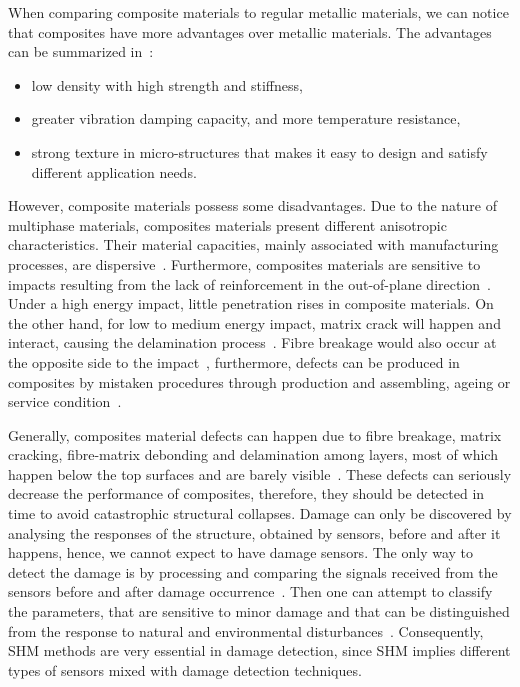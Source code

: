 When comparing composite materials to regular metallic materials, we can notice 
that composites have more advantages over metallic materials. 
The advantages can be summarized in~\cite{Campbell2010}:

\begin{itemize}
	\item low density with high strength and stiffness, 
	\item greater vibration damping capacity, and more temperature resistance,
	\item strong texture in micro-structures that makes it easy to design and 
	satisfy different application needs. 
\end{itemize}

However, composite materials possess some disadvantages.
Due to the nature of multiphase materials, composites materials present 
different anisotropic characteristics. 
Their material capacities, mainly associated with manufacturing processes, are 
dispersive~\cite{Awad2012}. 
Furthermore, composites materials are sensitive to impacts resulting 
from the lack of reinforcement in the out-of-plane direction~\cite{Cai2012}. 
Under a high energy impact, little penetration rises in composite materials. 
On the other hand, for low to medium energy impact, matrix crack will happen 
and interact, causing the delamination process~\cite{Cai2012}. 
Fibre breakage would also occur at the opposite side to the 
impact~\cite{Montalvao2006}, furthermore, defects can be produced in composites 
by mistaken procedures through production and assembling, ageing or service 
condition~\cite{Cai2012}. 

Generally, composites material defects can happen due to fibre breakage, 
matrix cracking, fibre-matrix debonding and delamination among layers, most of 
which happen below the top surfaces and are barely visible~\cite{Cai2012}. 
These defects can seriously decrease the performance of composites,  therefore, 
they should be detected in time to avoid catastrophic structural collapses.  
Damage can only be discovered by analysing the responses of the structure, 
obtained by sensors, before and after it happens, hence, we cannot expect to have damage sensors.
The only way to detect the damage is by processing and comparing the signals received from the sensors before and after damage occurrence~\cite{s18041094}. 
Then one can attempt to classify the parameters, that are sensitive to minor damage and that can be distinguished from the response to natural and environmental disturbances~\cite{s18041094}. 
Consequently, SHM  methods are very essential in damage detection, since SHM 
implies different types of sensors mixed with damage detection techniques. 


